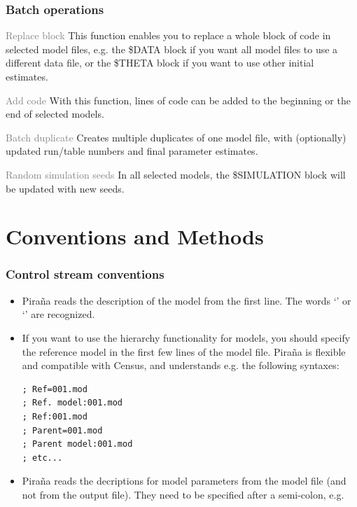 \documentclass[a4,11pt]{report} \usepackage[pdftex]{graphicx}
\begin{document}
{\subsubsection*{Batch operations}
\begin{description}
	\item{\textcolor{Grey}{Replace block}} This function enables
you to replace a whole block of code in selected model files, e.g. the
\$DATA block if you want all model files to use a different data file,
or the \$THETA block if you want to use other initial estimates.
	\item{\textcolor{Grey}{Add code}} With this function, lines of
code can be added to the beginning or the end of selected models.
	\item{\textcolor{Grey}{Batch duplicate}} Creates multiple
duplicates of one model file, with (optionally) updated run/table
numbers and final parameter estimates.
	\item{\textcolor{Grey}{Random simulation seeds}} In all
selected models, the \$SIMULATION block will be updated with new
seeds.
\end{description}

\section{Conventions and Methods}
\subsubsection{Control stream conventions}
\begin{itemize}
\item Pira\~na reads the description of the model from the first line. The
words `' \normalfont or `'
\normalfont are recognized.
\item If you want to use the hierarchy functionality for models, you
should specify the reference model in the first few lines of the model
file. Pira\~na is flexible and compatible with Census, and understands
e.g. the following syntaxes:

\begin{verbatim}
; Ref=001.mod
; Ref. model:001.mod
; Ref:001.mod
; Parent=001.mod
; Parent model:001.mod
; etc...
\end{verbatim}

\item Pira\~na reads the decriptions for model parameters from the
model file (and not from the output file). They need to be specified
after a semi-colon, e.g.


\end{itemize}}
\end{document}
